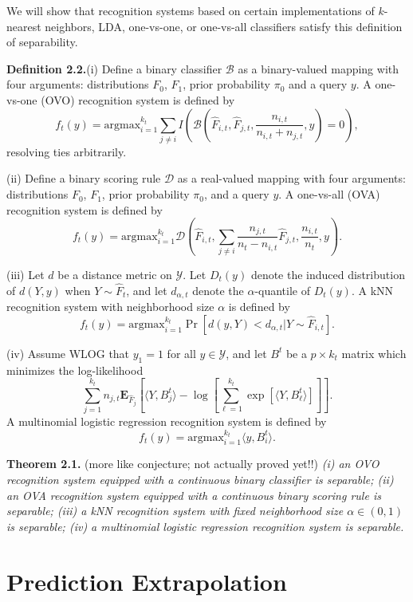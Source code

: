\documentclass{article}
\newcommand{\E}{\textbf{E}}
\newcommand{\argmax}{\text{argmax}}
\begin{document}
We will show that recognition systems based on certain implementations
of $k$-nearest neighbors, LDA, one-vs-one, or one-vs-all classifiers
satisfy this definition of separability.

\textbf{Definition 2.2.}(i) Define a binary classifier $\mathcal{B}$
as a binary-valued mapping with four arguments: distributions $F_0$,
$F_1$, prior probability $\pi_0$ and a query $y$.  A one-vs-one (OVO)
recognition system is defined by
\[
f_t(y) = \argmax_{i=1}^{k_t} \sum_{j \neq i} I\left(\mathcal{B}(\hat{F}_{i, t}, \hat{F}_{j, t}, \frac{n_{i, t}}{n_{i, t} + n_{j, t}}, y)=0\right),
\]
resolving ties arbitrarily.

(ii) Define a binary scoring rule $\mathcal{D}$ as a real-valued
mapping with four arguments: distributions $F_0$, $F_1$, prior
probability $\pi_0$, and a query $y$.  A one-vs-all (OVA) recognition
system is defined by
\[
f_t(y) = \argmax_{i=1}^{k_t} \mathcal{D}\left(\hat{F}_{i, t},
\sum_{j\neq i} \frac{n_{j, t}}{n_t - n_{i, t}}\hat{F}_{j, t},
\frac{n_{i, t}}{n_t}, y\right).
\]

(iii) Let $d$ be a distance metric on $\mathcal{Y}$.  Let $D_t(y)$
denote the induced distribution of $d(Y, y)$ when $Y \sim \hat{F}_t$,
and let $d_{\alpha, t}$ denote the $\alpha$-quantile of $D_t(y)$.  A
kNN recognition system with neighborhood size $\alpha$ is defined by
\[
f_t(y) = \argmax_{i=1}^{k_t} \Pr[d(y, Y) < d_{\alpha, t} |Y \sim \hat{F}_{i, t}].
\]

(iv) Assume WLOG that $y_1 = 1$ for all $y \in \mathcal{Y}$, and let
$B^t$ be a $p \times k_t$ matrix which minimizes the log-likelihood
\[
\sum_{j=1}^{k_t}n_{j, t}\E_{\hat{F}_j}\left[\langle Y, B^t_j \rangle - \log\left[\sum_{\ell=1}^{k_t} \exp[\langle Y, B^t_\ell \rangle]\right]\right].
\]
A multinomial logistic regression recognition system is defined by
\[
f_t(y) = \argmax_{i=1}^{k_t} \langle y, B^t_i\rangle.
\]

\textbf{Theorem 2.1.}{\color{red} (more like conjecture; not actually
  proved yet!!)}  \emph{(i) an OVO recognition system equipped with a
  continuous binary classifier is separable; (ii) an OVA recognition
  system equipped with a continuous binary scoring rule is separable;
  (iii) a kNN recognition system with fixed neighborhood size $\alpha
  \in (0, 1)$ is separable; (iv) a multinomial logistic regression
  recognition system is separable.}

\section{Prediction Extrapolation}
\end{document}
